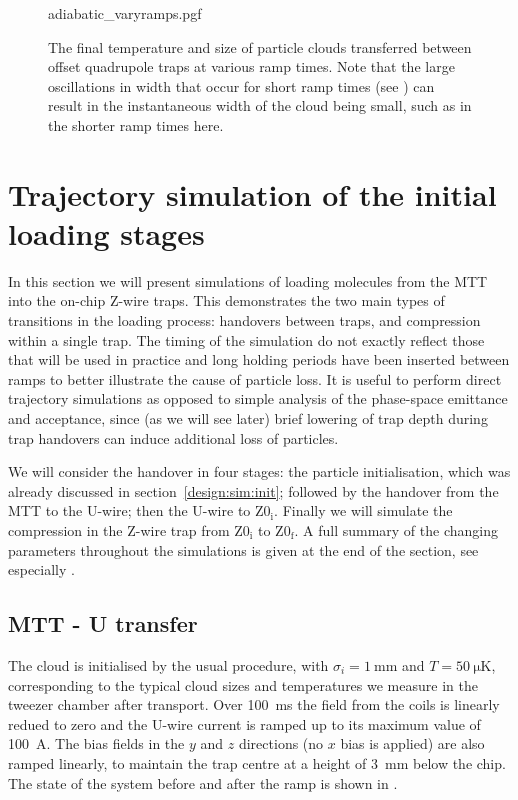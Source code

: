 \begin{figure}[t!]
\centering
  {adiabatic_varyramps.pgf}
  \caption{
    The final temperature and size of particle clouds transferred between
    offset quadrupole traps at various ramp times. Note that the large
    oscillations in width that occur for short ramp times (see
    ) can result in the instantaneous width of
    the cloud being small, such as in the shorter ramp times here.
  }
  \label{design:fig:adiavary}
\end{figure}


\section{Trajectory simulation of the initial loading stages}

In this section we will present simulations of loading molecules from the MTT
into the on-chip Z-wire traps. 
This demonstrates
the two main types of transitions in the loading process: handovers between
traps, and compression within a single trap. The timing of the simulation do
not exactly reflect those that will be used in practice and long holding periods
have been inserted between ramps to better illustrate the cause of particle
loss. It is useful to perform direct trajectory simulations as opposed to
simple analysis of the phase-space emittance and acceptance, since (as we will
see later) brief lowering of trap depth during trap handovers can induce
additional loss of particles.

We will consider the handover in four stages: the particle initialisation, which
was already discussed in section~\ref{design:sim:init}; followed by the
handover from the MTT to the U-wire; then the U-wire to $\mathrm{Z0_i}$.
Finally we will simulate the compression in the Z-wire trap from
$\mathrm{Z0_i}$ to $\mathrm{Z0_f}$. A full summary of the changing parameters
throughout the simulations is given at the end of the section, see especially
.

\subsection{MTT - U transfer}
\label{design:sim:trans_U}

The cloud is initialised by the usual procedure, with $\sigma_i =
\SI{1}{\milli\meter}$ and $T=\SI{50}{\micro\kelvin}$, corresponding to the
typical cloud sizes and temperatures we measure in the tweezer chamber after
transport. Over \SI{100}{\milli\second} the field from the coils is linearly
redued to zero and the U-wire current is ramped up to its maximum value of
\SI{100}{\ampere}. The bias fields in the $y$ and $z$ directions (no $x$ bias
is applied) are also ramped linearly, to maintain the trap centre at a height
of \SI{3}{\milli\meter} below the chip. The state of the system before and
after the ramp is shown in .

